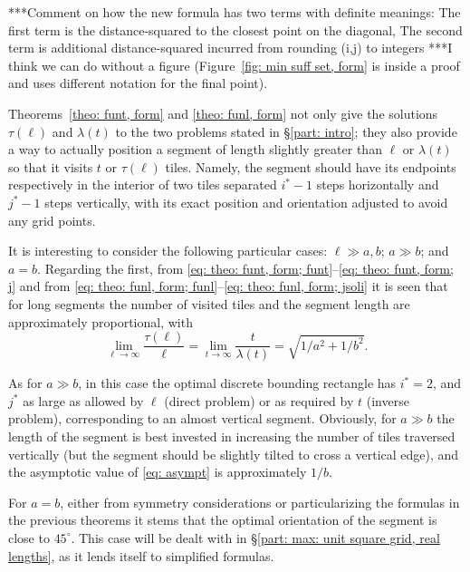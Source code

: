 \documentclass[12pt, a4paper]{article}
\newcommand{\funt}{\tau} %
\newcommand{\funl}{\lambda} %
\newcommand{\len}{\ell} %
\newcommand{\tiles}{t} %
\newcommand{\isoli}{i^\ast}
\newcommand{\jsoli}{j^\ast}
\begin{document}
***Comment on how the new formula has two terms with definite meanings: The first term is the distance-squared to the closest point on the diagonal, The second term is additional distance-squared incurred from rounding (i,j) to integers
***I think we can do without a figure (Figure~\ref{fig: min suff set, form} is inside a proof and uses different notation for the final point).

Theorems~\ref{theo: funt, form} and \ref{theo: funl, form} not only give the solutions $\funt(\len)$ and $\funl(\tiles)$ to the two problems stated in \S\ref{part: intro}; they also provide a way to actually position a segment of length slightly greater than $\len$ or $\funl(\tiles)$ so that it visits $\tiles$ or $\funt(\len)$ tiles. Namely, the segment should have its endpoints respectively in the interior of two tiles separated $\isoli-1$ steps horizontally and $\jsoli-1$ steps vertically, with its exact position and orientation  adjusted to avoid any grid points.

It is interesting to consider the following particular cases: $\len \gg a,b$; $a \gg b$; and $a=b$. Regarding the first, from \eqref{eq: theo: funt, form; funt}--\eqref{eq: theo: funt, form; j}
and from \eqref{eq: theo: funl, form; funl}--\eqref{eq: theo: funl, form; jsoli}
it is seen that for long segments the number of visited tiles and the segment length are approximately proportional, with
\begin{equation}
\label{eq: asympt}
\lim_{\len \rightarrow \infty} \frac{\funt(\len)}{\len}
= \lim_{\tiles \rightarrow \infty} \frac{\tiles}{\funl(\tiles)}
= \sqrt{1/a^2 + 1/b^2}.
\end{equation}

As for $a \gg b$, in this case the optimal discrete bounding rectangle has $\isoli = 2$, and $\jsoli$ as large as allowed by $\len$ (direct problem) or as required by $\tiles$ (inverse problem), corresponding to an almost vertical segment. Obviously, for $a \gg b$ the length of the segment is best invested in increasing the number of tiles traversed vertically (but the segment should be slightly tilted to cross a vertical edge), and the asymptotic value of \eqref{eq: asympt} is approximately $1/b$.

For $a=b$, either from symmetry considerations or particularizing the formulas in the previous theorems it stems that the optimal orientation of the segment is close to $45^\circ$. This case will be dealt with in \S\ref{part: max: unit square grid, real lengths}, as it lends itself to simplified formulas.
\end{document}

